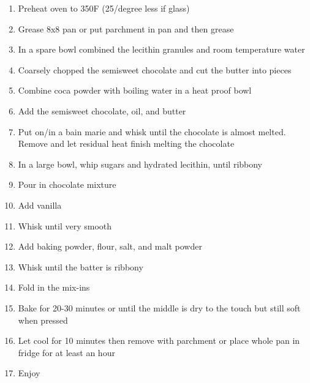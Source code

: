 \begin{footnotesize}
\begin{enumerate}
    \item Preheat oven to 350\degree F (25/degree less if glass)
    \item Grease 8x8 pan or put parchment in pan and then grease
    \item In a spare bowl combined the lecithin granules and room temperature water

    \item Coarsely chopped the semisweet chocolate and cut the butter into pieces
    \item Combine coca powder with boiling water in a heat proof bowl
    \item Add the semisweet chocolate, oil, and butter
    \item Put on/in a bain marie and whisk until the chocolate is almost melted. Remove and let residual heat finish melting the chocolate

    \item In a large bowl, whip sugars and hydrated lecithin, until ribbony
    \item Pour in chocolate mixture
    \item Add vanilla
    \item Whisk until very smooth

    \item Add baking powder, flour, salt, and malt powder
    \item Whisk until the batter is ribbony
    \item Fold in the mix-ins
    \item Bake for 20-30 minutes or until the middle is dry to the touch but still soft when pressed
    \item Let cool for 10 minutes then remove with parchment or place whole pan in fridge for at least an hour
    \item Enjoy

\end{enumerate}
\end{footnotesize}

\vspace{2em}

